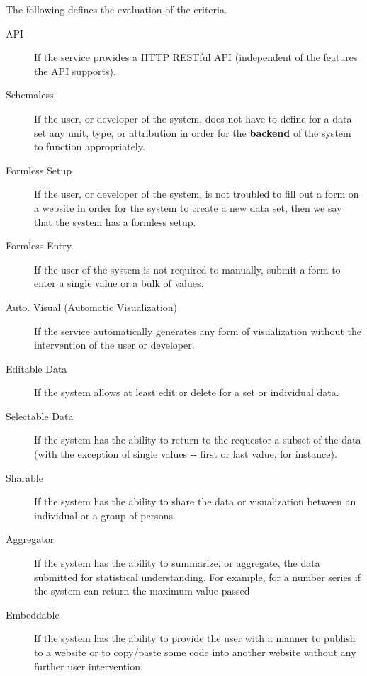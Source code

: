 \documentclass[10pt,a4paper,english]{article}
\begin{document}
The following defines the evaluation of the criteria.
\begin{description}
\item[{API}] \leavevmode 
If the service provides a HTTP RESTful API (independent of the features the API supports).

\item[{Schemaless}] \leavevmode 
If the user, or developer of the system, does not have to define for a data set any unit, type, or attribution in order for the \textbf{backend} of the system to function appropriately.

\item[{Formless Setup}] \leavevmode 
If the user, or developer of the system, is not troubled to fill out a form on a website in order for the system to create a new data set, then we say that the system has a formless setup.

\item[{Formless Entry}] \leavevmode 
If the user of the system is not required to manually, submit a form to enter a single value or a bulk of values.

\item[{Auto. Visual (Automatic Visualization)}] \leavevmode 
If the service automatically generates any form of visualization without the intervention of the user or developer.

\item[{Editable Data}] \leavevmode 
If the system allows at least edit or delete for a set or individual data.

\item[{Selectable Data}] \leavevmode 
If the system has the ability to return to the requestor a subset of the data (with the exception of single values -{}- first or last value, for instance).

\item[{Sharable}] \leavevmode 
If the system has the ability to share the data or visualization between an individual or a group of persons.

\item[{Aggregator}] \leavevmode 
If the system has the ability to summarize, or aggregate, the data submitted for statistical understanding. For example, for a number series if the system can return the maximum value passed

\item[{Embeddable}] \leavevmode 
If the system has the ability to provide the user with a manner to publish to a website or to copy/paste some code into another website without any further user intervention.

\end{description}
\end{document}
